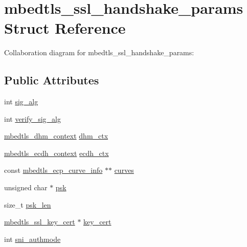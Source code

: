 \hypertarget{structmbedtls__ssl__handshake__params}{}\section{mbedtls\+\_\+ssl\+\_\+handshake\+\_\+params Struct Reference}
\label{structmbedtls__ssl__handshake__params}


Collaboration diagram for mbedtls\+\_\+ssl\+\_\+handshake\+\_\+params\+:
\subsection*{Public Attributes}
\begin{DoxyCompactItemize}
\item 
int \mbox{\hyperlink{structmbedtls__ssl__handshake__params_a5bd51cd234637157e288f1e5779701c5}{sig\+\_\+alg}}
\item 
int \mbox{\hyperlink{structmbedtls__ssl__handshake__params_ab950ce283cc477ea1a246689ecd2a22d}{verify\+\_\+sig\+\_\+alg}}
\item 
\mbox{\hyperlink{structmbedtls__dhm__context}{mbedtls\+\_\+dhm\+\_\+context}} \mbox{\hyperlink{structmbedtls__ssl__handshake__params_aaa85609e03e300c910db01e8a321950f}{dhm\+\_\+ctx}}
\item 
\mbox{\hyperlink{structmbedtls__ecdh__context}{mbedtls\+\_\+ecdh\+\_\+context}} \mbox{\hyperlink{structmbedtls__ssl__handshake__params_ac817564988b758dfa0d6829f78817712}{ecdh\+\_\+ctx}}
\item 
const \mbox{\hyperlink{structmbedtls__ecp__curve__info}{mbedtls\+\_\+ecp\+\_\+curve\+\_\+info}} $\ast$$\ast$ \mbox{\hyperlink{structmbedtls__ssl__handshake__params_a521abec631fe5c81cf5c094cc374b8eb}{curves}}
\item 
unsigned char $\ast$ \mbox{\hyperlink{structmbedtls__ssl__handshake__params_a249e9ec2254eef073c3ead5544139415}{psk}}
\item 
size\+\_\+t \mbox{\hyperlink{structmbedtls__ssl__handshake__params_ac91fb6cfeeda006fa2b9a1749186d216}{psk\+\_\+len}}
\item 
\mbox{\hyperlink{structmbedtls__ssl__key__cert}{mbedtls\+\_\+ssl\+\_\+key\+\_\+cert}} $\ast$ \mbox{\hyperlink{structmbedtls__ssl__handshake__params_a149899c222855d2cc33aa4cc326b09cd}{key\+\_\+cert}}
\item 
int \mbox{\hyperlink{structmbedtls__ssl__handshake__params_ada4c8d021bb297b6728d6f117a026fd0}{sni\+\_\+authmode}}
\item 
$$
\end{DoxyCompactItemize}
